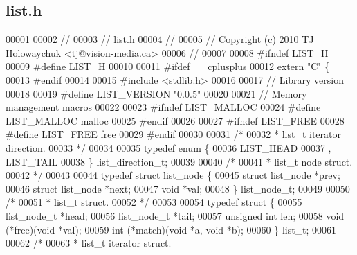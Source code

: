 \subsection{list.\+h}
\label{a00029_source}

\begin{DoxyCode}
00001 
00002 \textcolor{comment}{//}
00003 \textcolor{comment}{// list.h}
00004 \textcolor{comment}{//}
00005 \textcolor{comment}{// Copyright (c) 2010 TJ Holowaychuk <tj@vision-media.ca>}
00006 \textcolor{comment}{//}
00007 
00008 \textcolor{preprocessor}{#ifndef LIST\_H}
00009 \textcolor{preprocessor}{#define LIST\_H}
00010 
00011 \textcolor{preprocessor}{#ifdef \_\_cplusplus}
00012 \textcolor{keyword}{extern} \textcolor{stringliteral}{"C"} \{
00013 \textcolor{preprocessor}{#endif}
00014 
00015 \textcolor{preprocessor}{#include <stdlib.h>}
00016 
00017 \textcolor{comment}{// Library version}
00018 
00019 \textcolor{preprocessor}{#define LIST\_VERSION "0.0.5"}
00020 
00021 \textcolor{comment}{// Memory management macros}
00022 
00023 \textcolor{preprocessor}{#ifndef LIST\_MALLOC}
00024 \textcolor{preprocessor}{#define LIST\_MALLOC malloc}
00025 \textcolor{preprocessor}{#endif}
00026 
00027 \textcolor{preprocessor}{#ifndef LIST\_FREE}
00028 \textcolor{preprocessor}{#define LIST\_FREE free}
00029 \textcolor{preprocessor}{#endif}
00030 
00031 \textcolor{comment}{/*}
00032 \textcolor{comment}{ * list\_t iterator direction.}
00033 \textcolor{comment}{ */}
00034 
00035 \textcolor{keyword}{typedef} \textcolor{keyword}{enum} \{
00036     LIST_HEAD
00037   , LIST_TAIL
00038 \} list_direction_t;
00039 
00040 \textcolor{comment}{/*}
00041 \textcolor{comment}{ * list\_t node struct.}
00042 \textcolor{comment}{ */}
00043 
00044 \textcolor{keyword}{typedef} \textcolor{keyword}{struct }list_node \{
00045   \textcolor{keyword}{struct }list_node *prev;
00046   \textcolor{keyword}{struct }list_node *next;
00047   \textcolor{keywordtype}{void} *val;
00048 \} list_node_t;
00049 
00050 \textcolor{comment}{/*}
00051 \textcolor{comment}{ * list\_t struct.}
00052 \textcolor{comment}{ */}
00053 
00054 \textcolor{keyword}{typedef} \textcolor{keyword}{struct }\{
00055   list_node_t *head;
00056   list_node_t *tail;
00057   \textcolor{keywordtype}{unsigned} \textcolor{keywordtype}{int} len;
00058   void (*free)(\textcolor{keywordtype}{void} *val);
00059   int (*match)(\textcolor{keywordtype}{void} *a, \textcolor{keywordtype}{void} *b);
00060 \} list_t;
00061 
00062 \textcolor{comment}{/*}
00063 \textcolor{comment}{ * list\_t iterator struct.}

\end{DoxyCode}
